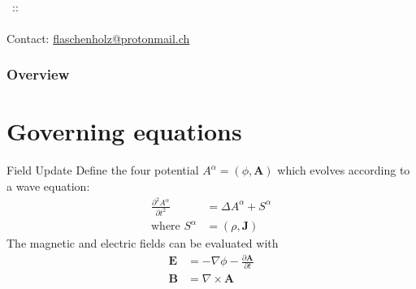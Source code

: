 \documentclass[5pt]{beamer}
\makeatletter
\def \myEmail {flaschenholz@protonmail.ch}
\makeatother
\begin{document}
\begin{frame}
\begin{adjustbox}{width=\paperwidth, center}
  \end{adjustbox}
  \vspace{0.1cm}\\
  { \footnotesize \insertauthor\, ::  \insertinstitute}
  \vspace{0.4cm}
  { \LARGE \inserttitle}\\
  \vspace{0.4cm}
  { \footnotesize \insertdate}\\
  \vfilll
  \null\hfill\tiny Contact: \url{\myEmail}
\end{frame}

\begin{frame}[noframenumbering]
\frametitle{Overview}
\tableofcontents %
\end{frame}

\section{Governing equations}
\frame[noframenumbering]{\tableofcontents[currentsection]}
\begin{frame}
{\huge Field Update}
Define the four potential $A^\alpha = \left(\phi, \mathbf{A}\right)$ which evolves according to a wave equation:
\begin{align*}
\frac{\partial^2 A^\alpha}{\partial t^2} &= \Delta A^\alpha + S^\alpha \\
\text{where } S^\alpha &= \left(\rho, \mathbf{J}\right)
\end{align*}
\pause
The magnetic and electric fields can be evaluated with
\begin{align*}
\mathbf{E} &= -\nabla \phi - \frac{\partial \mathbf{A}}{\partial t} \\
\mathbf{B} &= \nabla \times \mathbf{A}
\end{align*}
\end{frame}
\end{document}
